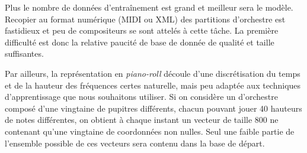 \documentclass[a4paper, 10pt]{article} %
\begin{document}
Plus le nombre de données d'entraînement est grand et meilleur sera le modèle. Recopier au format numérique (MIDI ou XML) des partitions d'orchestre est fastidieux et peu de compositeurs se sont attelés à cette tâche. La première difficulté est donc la relative paucité de base de donnée de qualité et taille suffisantes.

Par ailleurs, la représentation en \textit{piano-roll} découle d'une discrétisation du temps et de la hauteur des fréquences certes naturelle, mais peu adaptée aux techniques d'apprentissage que nous souhaitons utiliser. Si on considère un d'orchestre composé d'une vingtaine de pupitres différents, chacun pouvant jouer 40 hauteurs de notes différentes, on obtient à chaque instant un vecteur de taille 800 ne contenant qu'une vingtaine de coordonnées non nulles. Seul une faible partie de l'ensemble possible de ces vecteurs sera contenu dans la base de départ.
\end{document}
